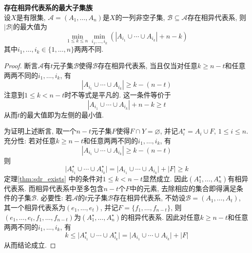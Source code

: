 \begin{col}\textbf{存在相异代表系的最大子集族}\\
设$X$是有限集, $\mathcal{A}=(A_1,\dots, A_n)$是$X$的一列非空子集, $\mathcal{B} \subseteq \mathcal{A}$存在相异代表系, 则$|\mathcal{B}|$的最大值为
\begin{equation}
    \min\limits_{1\le k\le n} \min\limits_{i_1,\dots, i_k} \left(|A_{i_1} \cup \cdots \cup A_{i_k}| + n - k\right)
\end{equation}
其中$i_1,\dots, i_k\in\{1,\dots,n\}$两两不同. 
\end{col}
\begin{proof}
断言$\mathcal{A}$有$t$元子集$\mathcal{B}$使得$\mathcal{B}$存在相异代表系, 当且仅当对任意$k\ge n-t$和任意两两不同的$i_1,\dots, i_k$, 有
\begin{equation}
    |A_{i_1} \cup \cdots \cup A_{i_k}| \ge k - (n-t)
\end{equation}
注意到$1\le k<n-t$时不等式是平凡的. 这一条件等价于
\begin{equation}
    |A_{i_1} \cup \cdots \cup A_{i_k}| + n - k \ge t
\end{equation}
从而$t$的最大值即为左侧的最小值. 

为证明上述断言, 取一个$n-t$元子集$F$使得$F\cap Y = \varnothing$, 并记$A^\star_{i} = A_{i} \cup F$, $1\le i\le n$. 充分性: 若对任意$k\ge n-t$和任意两两不同的$i_1,\dots, i_k$, 有
\begin{equation}
    |A_{i_1} \cup \cdots \cup A_{i_k}| \ge k - (n-t)
\end{equation}
则
\begin{equation}
    \vert A^\star_{i_1} \cup \cdots \cup A^\star_{i_k}\vert = \vert A_{i_1} \cup \cdots \cup A_{i_k}\vert + |F| \ge k
\end{equation}
定理\ref{thm:sdr_exists} 中的条件对$1\le k<n-t$显然成立. 因此$(A^\star_1,\dots, A^\star_n)$有相异代表系. 而相异代表系中至多包含$n-t$个$F$中的元素, 去除相应的集合即得满足条件的子集$\mathcal{B}$. 必要性: 若$\mathcal{A}$的$t$元子集$\mathcal{B}$存在相异代表系, 不妨设$\mathcal{B}=(A_1,\dots, A_t)$, 其一个相异代表系为$(e_1,\dots,e_t)$, 并记$F=\{f_1,\dots,f_{n-t}\}$, 则$(e_1,\dots,e_t, f_1,\dots, f_{n-t})$为$(A^\star_1,\dots, A^\star_n)$的相异代表系. 因此对任意$k\ge n-t$和任意两两不同的$i_1,\dots, i_k$, 有
\begin{equation}
    k \le \vert A^\star_{i_1} \cup \cdots \cup A^\star_{i_k}\vert = \vert A_{i_1} \cup \cdots \cup A_{i_k}\vert + |F|
\end{equation}
从而结论成立. 
\end{proof}

